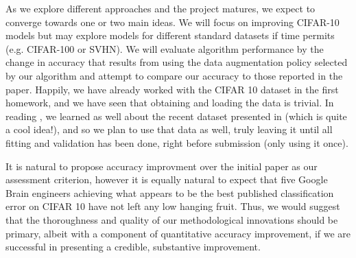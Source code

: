 \documentclass[10pt,twocolumn,letterpaper]{article}
\begin{document}
As we explore different approaches and the project matures, we expect to converge towards one or two main ideas. We will focus on improving CIFAR-10 models but may explore models for different standard datasets if time permits (e.g. CIFAR-100 or SVHN). We will evaluate algorithm performance by the change in accuracy that results from using the data augmentation policy selected by our algorithm and attempt to compare our accuracy to those reported in the paper. Happily, we have already worked with the CIFAR 10 dataset in the first homework, and we have seen that obtaining and loading the data is trivial. In reading \cite{Cubuk2018}, we learned as well about the recent dataset presented in \cite{Recht2018} (which is quite a cool idea!), and so we plan to use that data as well, truly leaving it until all fitting and validation has been done, right before submission (only using it once).

It is natural to propose accuracy improvment over the initial paper as our assessment criterion, however it is equally natural to expect that five Google Brain engineers achieving what appears to be the best published classification error on CIFAR 10 have not left any low hanging fruit. Thus, we would suggest that the thoroughness and quality of our methodological innovations should be primary, albeit with a component of quantitative accuracy improvement, if we are successful in presenting a credible, substantive improvement.


{\small


}
\end{document}
